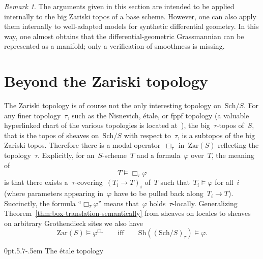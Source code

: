 \documentclass[10pt,reqno,a4paper]{amsbook}
\makeatletter
\theoremstyle{definition}
\theoremstyle{plain}
\theoremstyle{remark}
\newtheorem{rem}[defn]{Remark}
\newcommand{\Sh}{\mathrm{Sh}}
\newcommand{\Zar}{\mathrm{Zar}}
\newcommand{\Sch}{\mathrm{Sch}}
\newcommand{\?}{\,{:}\,}
\renewcommand{\_}{\mathpunct{.}\,}
\def\subsection{\@startsection{subsection}{2}%
  {0pt}{.5\linespacing\@plus.7\linespacing}{-.5em}%
  {\normalfont\bfseries}}
\makeatother
\begin{document}
\begin{rem}The arguments given in this section are intended to be
applied internally to the big Zariski topos of a base scheme. However, one can
also apply them internally to well-adapted models for synthetic differential
geometry. In this way, one almost obtains that the differential-geometric
Grassmannian can be represented as a manifold; only a verification of
smoothness is missing.
\end{rem}


\section{Beyond the Zariski topology}
\label{sect:beyond-zariski}

The Zariski topology is of course not the only interesting topology
on~$\Sch/S$. For any finer topology~$\tau$, such as the Nisnevich, étale, or fppf
topology (a valuable hyperlinked chart of the various topologies is located
at~\cite{belmans:topologies}), the big~$\tau$-topos of~$S$, that is the topos
of sheaves on~$\Sch/S$ with respect to~$\tau$, is a subtopos
of the big Zariski topos. Therefore there is a modal operator~$\Box_\tau$
in~$\Zar(S)$ reflecting the topology~$\tau$. Explicitly, for an~$S$-scheme~$T$
and a formula~$\varphi$ over~$T$, the meaning of
\[ T \models \Box_\tau \varphi \]
is that there exists a~$\tau$-covering~$(T_i \to T)_i$ of~$T$ such that~$T_i
\models \varphi$ for all~$i$ (where parameters appearing in~$\varphi$ have to
be pulled back along~$T_i \to T$). Succinctly, the formula ``$\Box_\tau
\varphi$'' means that~$\varphi$ holds~$\tau$-locally. Generalizing
Theorem~\ref{thm:box-translation-semantically} from sheaves on locales to
sheaves on arbitrary Grothendieck sites we also have
\[ \Zar(S) \models \varphi^{\Box_\tau} \qquad\text{iff}\qquad
  \Sh((\Sch/S)_\tau) \models \varphi. \]


\subsection{The étale topology}
\end{document}
